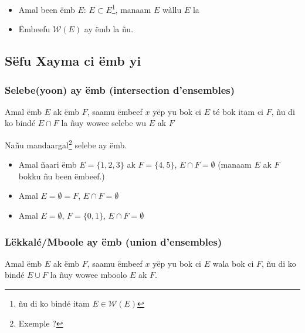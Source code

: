 \documentclass[twoside, a4paper]{article}
\begin{document}
\begin{tcolorbox}[enhanced jigsaw,breakable,pad at break*=1mm,
colback=yellow!5!white,colframe=white!75!black,title= Seetlu,
watermark color=white]
\begin{itemize}
    \item Amal been ëmb $E$: $E\subset E$\footnote{ñu di ko bindé itam  $E \in\mathcal{W}(E)$}, manaam $E$ wàllu $E$ la
    \item Ëmbeefu $\mathcal{W}(E)$ ay ëmb la ñu.    
\end{itemize}
\end{tcolorbox}


\subsection{Sëfu Xayma ci ëmb yi}
\subsubsection{Selebe(yoon) ay ëmb (intersection d'ensembles)}

\begin{tcolorbox}[enhanced jigsaw,breakable,pad at break*=1mm,
  colback=red!5!white,colframe=white!75!black,title= Téeki,
  watermark color=white]
Amal ëmb $E$ ak ëmb $F$, saamu ëmbeef $x$ yëp yu bok ci $E$ té bok itam ci $F$, ñu di ko bindé $E \cap F$  la ñuy wowee selebe wu $E$ ak $F$
\end{tcolorbox} 

Nañu mandaargal\footnote{Exemple ?} selebe ay ëmb.
\begin{itemize}
    \item Amal  ñaari ëmb $E = \{1,2,3\}$ ak $F=\{4,5\}$, $E \cap F = \emptyset$ (manaam $E$ ak $F$ bokku ñu been ëmbeef.)
    \item Amal $E = \emptyset = F$, $E \cap F = \emptyset$
    \item Amal $E = \emptyset$, $F = \{0,1\}$, $E \cap F = \emptyset$
\end{itemize}

\subsubsection{Lëkkalé/Mboole ay ëmb (union d'ensembles)}

\begin{tcolorbox}[enhanced jigsaw,breakable,pad at break*=1mm,
  colback=red!5!white,colframe=white!75!black,title= Téeki,
  watermark color=white]
Amal ëmb $E$ ak ëmb $F$, saamu ëmbeef $x$ yëp yu bok ci $E$ wala bok ci $F$, ñu di ko bindé $E \cup F$  la ñuy wowee mboolo $E$ ak $F$.
\end{tcolorbox} 
\end{document}
